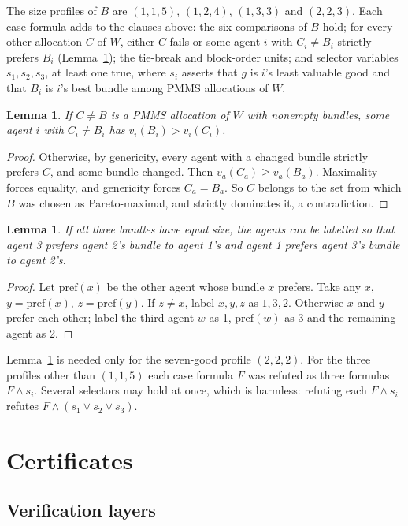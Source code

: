 \documentclass[11pt,a4paper]{article}
\newtheorem{lemma}[theorem]{Lemma}
\theoremstyle{remark}
\begin{document}
The size profiles of $B$ are $(1,1,5)$, $(1,2,4)$, $(1,3,3)$ and $(2,2,3)$. Each case formula adds to the clauses above: the six comparisons of $B$ hold; for every other allocation $C$ of $W$, either $C$ fails or some agent $i$ with $C_i\ne B_i$ strictly prefers $B_i$ (Lemma~\ref{lem:pareto}); the tie-break and block-order units; and selector variables $s_1,s_2,s_3$, at least one true, where $s_i$ asserts that $g$ is $i$'s least valuable good and that $B_i$ is $i$'s best bundle among PMMS allocations of $W$.

\begin{lemma}\label{lem:pareto}
If $C\ne B$ is a PMMS allocation of $W$ with nonempty bundles, some agent $i$ with $C_i\ne B_i$ has $v_i(B_i)>v_i(C_i)$.
\end{lemma}
\begin{proof}
Otherwise, by genericity, every agent with a changed bundle strictly prefers $C$, and some bundle changed. Then $v_a(C_a)\ge v_a(B_a)$. Maximality forces equality, and genericity forces $C_a=B_a$. So $C$ belongs to the set from which $B$ was chosen as Pareto-maximal, and strictly dominates it, a contradiction.
\end{proof}

\begin{lemma}\label{lem:tiebreak}
If all three bundles have equal size, the agents can be labelled so that agent 3 prefers agent 2's bundle to agent 1's and agent 1 prefers agent 3's bundle to agent 2's.
\end{lemma}
\begin{proof}
Let $\mathrm{pref}(x)$ be the other agent whose bundle $x$ prefers. Take any $x$, $y=\mathrm{pref}(x)$, $z=\mathrm{pref}(y)$. If $z\ne x$, label $x,y,z$ as $1,3,2$. Otherwise $x$ and $y$ prefer each other; label the third agent $w$ as 1, $\mathrm{pref}(w)$ as 3 and the remaining agent as 2.
\end{proof}

Lemma~\ref{lem:tiebreak} is needed only for the seven-good profile $(2,2,2)$. For the three profiles other than $(1,1,5)$ each case formula $F$ was refuted as three formulas $F\wedge s_i$. Several selectors may hold at once, which is harmless: refuting each $F\wedge s_i$ refutes $F\wedge(s_1\vee s_2\vee s_3)$.

\section{Certificates}\label{sec:certificates}

\subsection{Verification layers}
\end{document}
